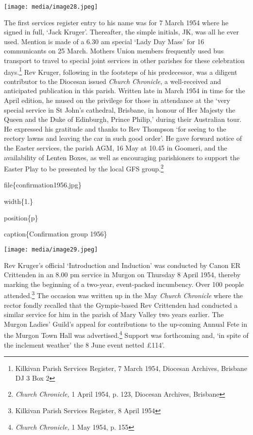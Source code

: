 \texttt{[image: media/image28.jpeg]}

The first services register entry to his name was for 7 March 1954 where he signed in full, `Jack Kruger'. Thereafter, the simple initials, JK, was all he ever used. Mention is made of a 6.30 am special `Lady Day Mass' for 16 communicants on 25 March. Mothers Union members frequently used bus transport to travel to special joint services in other parishes for these celebration days.\footnote{Kilkivan Parish Services Register, 7 March 1954, Diocesan Archives, Brisbane DJ 3 Box 2} Rev Kruger, following in the footsteps of his predecessor, was a diligent contributor to the Diocesan issued \emph{Church Chronicle}, a well-received and anticipated publication in this parish. Written late in March 1954 in time for the April edition, he mused on the privilege for those in attendance at the `very special service in St John's cathedral, Brisbane, in honour of Her Majesty the Queen and the Duke of Edinburgh, Prince Philip,' during their Australian tour. He expressed his gratitude and thanks to Rev Thompson `for seeing to the rectory lawns and leaving the car in such good order'. He gave forward notice of the Easter services, the parish AGM, 16 May at 10.45 in Goomeri, and the availability of Lenten Boxes, as well as encouraging parishioners to support the Easter Play to be presented by the local GFS group.\footnote{\emph{Church Chronicle,} 1 April 1954, p. 123, Diocesan Archives, Brisbane}

file\{confirmation1956.jpg\}

width\{1.\}

position\{p\}

caption\{Confirmation group 1956\}

\texttt{[image: media/image29.jpeg]}

Rev Kruger's official `Introduction and Induction' was conducted by Canon ER Crittenden in an 8.00 pm service in Murgon on Thursday 8 April 1954, thereby marking the beginning of a two-year, event-packed incumbency. Over 100 people attended.\footnote{Kilkivan Parish Services Register, 8 April 1954} The occasion was written up in the May \emph{Church Chronicle} where the rector fondly recalled that the Gympie-based Rev Crittenden had conducted a similar service for him in the parish of Mary Valley two years earlier. The Murgon Ladies' Guild's appeal for contributions to the up-coming Annual Fete in the Murgon Town Hall was advertised.\footnote{\emph{Church Chronicle,} 1 May 1954, p. 155} Support was forthcoming and, `in spite of the inclement weather' the 8 June event netted £114'.

